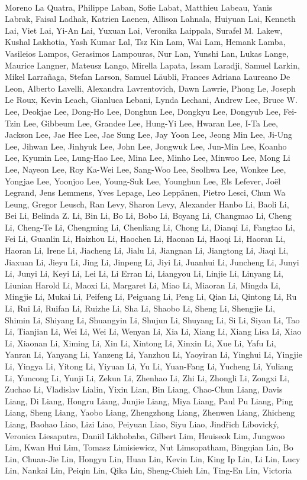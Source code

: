 \paragraph{}Moreno La Quatra, Philippe Laban, Sofie Labat, Matthieu Labeau, Yanis Labrak, Faisal Ladhak, Katrien Laenen, Allison Lahnala, Huiyuan Lai, Kenneth Lai, Viet Lai, Yi-An Lai, Yuxuan Lai, Veronika Laippala, Surafel M. Lakew, Kushal Lakhotia, Yash Kumar Lal, Tsz Kin Lam, Wai Lam, Hemank Lamba, Vasileios Lampos, Gerasimos Lampouras, Nur Lan, Yunshi Lan, Lukas Lange, Maurice Langner, Mateusz Lango, Mirella Lapata, Issam Laradji, Samuel Larkin, Mikel Larrañaga, Stefan Larson, Samuel Läubli, Frances Adriana Laureano De Leon, Alberto Lavelli, Alexandra Lavrentovich, Dawn Lawrie, Phong Le, Joseph Le Roux, Kevin Leach, Gianluca Lebani, Lynda Lechani, Andrew Lee, Bruce W. Lee, Deokjae Lee, Dong-Ho Lee, Donghun Lee, Dongkyu Lee, Dongyub Lee, Fei-Tzin Lee, Gibbeum Lee, Grandee Lee, Hung-Yi Lee, Hwaran Lee, I-Ta Lee, Jackson Lee, Jae Hee Lee, Jae Sung Lee, Jay Yoon Lee, Jeong Min Lee, Ji-Ung Lee, Jihwan Lee, Jinhyuk Lee, John Lee, Jongwuk Lee, Jun-Min Lee, Koanho Lee, Kyumin Lee, Lung-Hao Lee, Mina Lee, Minho Lee, Minwoo Lee, Mong Li Lee, Nayeon Lee, Roy Ka-Wei Lee, Sang-Woo Lee, Seolhwa Lee, Wonkee Lee, Yongjae Lee, Yoonjoo Lee, Young-Suk Lee, Younghun Lee, Els Lefever, Joël Legrand, Jens Lemmens, Yves Lepage, Leo Leppänen, Pietro Lesci, Chun Wa Leung, Gregor Leusch, Ran Levy, Sharon Levy, Alexander Hanbo Li, Baoli Li, Bei Li, Belinda Z. Li, Bin Li, Bo Li, Bobo Li, Boyang Li, Changmao Li, Cheng Li, Cheng-Te Li, Chengming Li, Chenliang Li, Chong Li, Dianqi Li, Fangtao Li, Fei Li, Guanlin Li, Haizhou Li, Haochen Li, Haonan Li, Haoqi Li, Haoran Li, Haoran Li, Irene Li, Jiacheng Li, Jialu Li, Jiangnan Li, Jiangtong Li, Jiaqi Li, Jiaxuan Li, Jieyu Li, Jing Li, Jinpeng Li, Jiyi Li, Juanhui Li, Juncheng Li, Junyi Li, Junyi Li, Keyi Li, Lei Li, Li Erran Li, Liangyou Li, Linjie Li, Linyang Li, Liunian Harold Li, Maoxi Li, Margaret Li, Miao Li, Miaoran Li, Mingda Li, Mingjie Li, Mukai Li, Peifeng Li, Peiguang Li, Peng Li, Qian Li, Qintong Li, Ru Li, Rui Li, Ruifan Li, Ruizhe Li, Sha Li, Shaobo Li, Sheng Li, Shengjie Li, Shimin Li, Shiyang Li, Shuangyin Li, Shujun Li, Shuyang Li, Si Li, Siyan Li, Tao Li, Tianjian Li, Wei Li, Wei Li, Wenyan Li, Xia Li, Xiang Li, Xiang Lisa Li, Xiao Li, Xiaonan Li, Ximing Li, Xin Li, Xintong Li, Xinxin Li, Xue Li, Yafu Li, Yanran Li, Yanyang Li, Yanzeng Li, Yanzhou Li, Yaoyiran Li, Yinghui Li, Yingjie Li, Yingya Li, Yitong Li, Yiyuan Li, Yu Li, Yuan-Fang Li, Yucheng Li, Yuliang Li, Yuncong Li, Yunji Li, Zekun Li, Zhenhao Li, Zhi Li, Zhongli Li, Zongxi Li, Zuchao Li, Vladislav Lialin, Yixin Lian, Bin Liang, Chao-Chun Liang, Davis Liang, Di Liang, Hongru Liang, Junjie Liang, Miya Liang, Paul Pu Liang, Ping Liang, Sheng Liang, Yaobo Liang, Zhengzhong Liang, Zhenwen Liang, Zhicheng Liang, Baohao Liao, Lizi Liao, Peiyuan Liao, Siyu Liao, Jindřich Libovický, Veronica Liesaputra, Daniil Likhobaba, Gilbert Lim, Heuiseok Lim, Jungwoo Lim, Kwan Hui Lim, Tomasz Limisiewicz, Nut Limsopatham, Bingqian Lin, Bo Lin, Chuan-Jie Lin, Hongyu Lin, Huan Lin, Kevin Lin, King Ip Lin, Li Lin, Lucy Lin, Nankai Lin, Peiqin Lin, Qika Lin, Sheng-Chieh Lin, Ting-En Lin, Victoria 